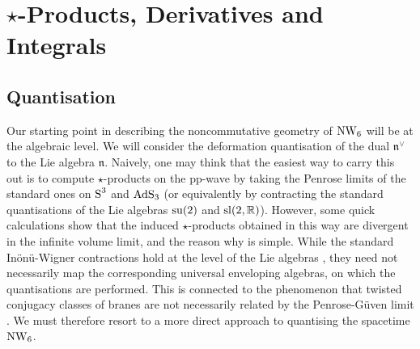 \chapter{$\star$-Products, Derivatives and Integrals}
\label{star}

\section{Quantisation}
\label{NWQuant}
Our starting point in describing the noncommutative geometry of $\NW_6$ will be
at the algebraic level. We will consider the deformation quantisation of the
dual $\mathfrak{n}^\vee$ to the Lie algebra $\mathfrak{n}$. Naively, one may
think that the easiest way to carry this out is to compute $\star$-products on
the pp-wave by taking the Penrose limits of the standard ones on $\S^3$ and
$\AdS_3$ (or equivalently by contracting the standard quantisations of the Lie
algebras ${\rm su}(2)$ and ${\rm sl}(2,\R)$). However, some quick calculations
show that the induced $\star$-products obtained in this way are divergent in the
infinite volume limit, and the reason why is simple. While the standard
In\"on\"u-Wigner contractions hold at the level of the Lie algebras
\cite{SF1}, they need not necessarily map the corresponding universal
enveloping algebras, on which the quantisations are performed. This is connected
to the phenomenon that twisted conjugacy classes of branes are not necessarily
related by the Penrose-G\"uven limit \cite{Halliday:2005zt}. We must therefore resort to a
more direct approach to quantising the spacetime $\NW_6$.

